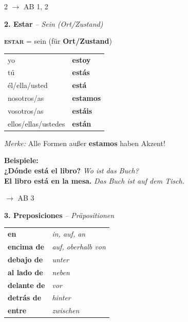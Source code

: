 \documentclass[11pt, a4paper]{article}
\newcommand{\seriftext}[1]{{\fontfamily{ppl}\selectfont #1}}
\newcommand{\es}[1]{\seriftext{\textbf{#1}}}
\newcommand{\de}[1]{\textit{\textcolor{akzent}{#1}}}
\newcommand{\gram}[1]{\textsc{#1}}
\newcommand{\abmark}[1]{{\footnotesize\textcolor{akzent}{$\rightarrow$ AB #1}}}
\newcommand{\abschnitt}[2]{\noindent\textbf{\large #1. #2}}
\begin{document}
\begin{multicols}{2}
\abmark{1, 2}

\columnbreak

\abschnitt{2}{Estar} \de{-- Sein (Ort/Zustand)}

\vspace{4pt}

\begin{grammatikbox}
\textbf{\gram{estar}} = sein (für \textbf{Ort/Zustand})

\vspace{6pt}

{\small
\begin{tabular}{@{}ll@{}}
yo & \es{estoy} \\
tú & \es{estás} \\
él/ella/usted & \es{está} \\
nosotros/as & \es{estamos} \\
vosotros/as & \es{estáis} \\
ellos/ellas/ustedes & \es{están} \\
\end{tabular}}

\vspace{6pt}

{\footnotesize\textit{Merke:} Alle Formen außer \es{estamos} haben Akzent!}
\end{grammatikbox}

\vspace{4pt}

\textbf{Beispiele:}\\
{\small
\es{¿Dónde está el libro?} \de{Wo ist das Buch?}\\
\es{El libro está en la mesa.} \de{Das Buch ist auf dem Tisch.}}

\abmark{3}

\vspace{8pt}

\abschnitt{3}{Preposiciones} \de{-- Präpositionen}

\vspace{4pt}

\begin{vokabelbox}
{\small
\begin{tabular}{@{}ll@{}}
\es{en} & \de{in, auf, an} \\[0.3em]
\es{encima de} & \de{auf, oberhalb von} \\[0.3em]
\es{debajo de} & \de{unter} \\[0.3em]
\es{al lado de} & \de{neben} \\[0.3em]
\es{delante de} & \de{vor} \\[0.3em]
\es{detrás de} & \de{hinter} \\[0.3em]
\es{entre} & \de{zwischen} \\
\end{tabular}}
\end{vokabelbox}


\end{multicols}
\end{document}
